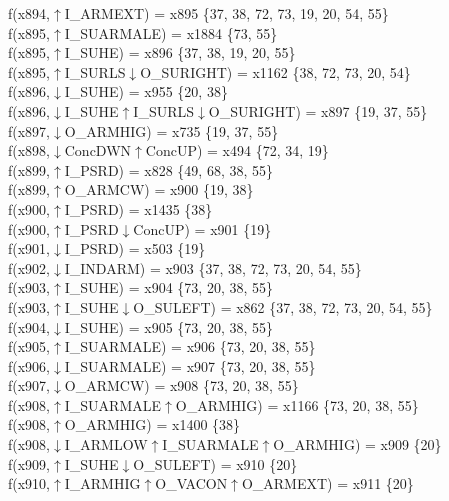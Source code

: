f(x894,$\uparrow$I\_ARMEXT) = x895 \{37, 38, 72, 73, 19, 20, 54, 55\} \\  
f(x895,$\uparrow$I\_SUARMALE) = x1884 \{73, 55\} \\  
f(x895,$\uparrow$I\_SUHE) = x896 \{37, 38, 19, 20, 55\} \\  
f(x895,$\uparrow$I\_SURLS$\downarrow$O\_SURIGHT) = x1162 \{38, 72, 73, 20, 54\} \\  
f(x896,$\downarrow$I\_SUHE) = x955 \{20, 38\} \\  
f(x896,$\downarrow$I\_SUHE$\uparrow$I\_SURLS$\downarrow$O\_SURIGHT) = x897 \{19, 37, 55\} \\  
f(x897,$\downarrow$O\_ARMHIG) = x735 \{19, 37, 55\} \\  
f(x898,$\downarrow$ConcDWN$\uparrow$ConcUP) = x494 \{72, 34, 19\} \\  
f(x899,$\uparrow$I\_PSRD) = x828 \{49, 68, 38, 55\} \\  
f(x899,$\uparrow$O\_ARMCW) = x900 \{19, 38\} \\  
f(x900,$\uparrow$I\_PSRD) = x1435 \{38\} \\  
f(x900,$\uparrow$I\_PSRD$\downarrow$ConcUP) = x901 \{19\} \\  
f(x901,$\downarrow$I\_PSRD) = x503 \{19\} \\  
f(x902,$\downarrow$I\_INDARM) = x903 \{37, 38, 72, 73, 20, 54, 55\} \\  
f(x903,$\uparrow$I\_SUHE) = x904 \{73, 20, 38, 55\} \\  
f(x903,$\uparrow$I\_SUHE$\downarrow$O\_SULEFT) = x862 \{37, 38, 72, 73, 20, 54, 55\} \\  
f(x904,$\downarrow$I\_SUHE) = x905 \{73, 20, 38, 55\} \\  
f(x905,$\uparrow$I\_SUARMALE) = x906 \{73, 20, 38, 55\} \\  
f(x906,$\downarrow$I\_SUARMALE) = x907 \{73, 20, 38, 55\} \\  
f(x907,$\downarrow$O\_ARMCW) = x908 \{73, 20, 38, 55\} \\  
f(x908,$\uparrow$I\_SUARMALE$\uparrow$O\_ARMHIG) = x1166 \{73, 20, 38, 55\} \\  
f(x908,$\uparrow$O\_ARMHIG) = x1400 \{38\} \\  
f(x908,$\downarrow$I\_ARMLOW$\uparrow$I\_SUARMALE$\uparrow$O\_ARMHIG) = x909 \{20\} \\  
f(x909,$\uparrow$I\_SUHE$\downarrow$O\_SULEFT) = x910 \{20\} \\  
f(x910,$\uparrow$I\_ARMHIG$\uparrow$O\_VACON$\uparrow$O\_ARMEXT) = x911 \{20\} \\  
